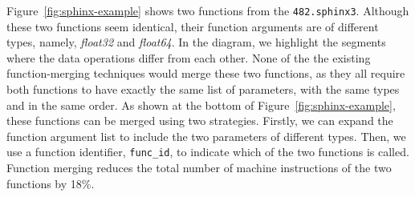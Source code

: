 Figure~\ref{fig:sphinx-example} shows two functions from the \texttt{482.sphinx3}. Although these two functions seem identical, their
function arguments are of different types, namely, \textit{float32} and \textit{float64}. In the diagram, we highlight the segments where
the data operations differ from each other. None of the the existing function-merging techniques would merge these two functions, as they
all require both functions to have exactly the same list of parameters, with the same types and in the same order. As shown at the bottom
of Figure~\ref{fig:sphinx-example}, these functions can be merged using two strategies. Firstly, we can expand the function argument list
to include the two parameters of different types. Then, we use a function identifier, \texttt{func\_id}, to indicate which of the two
functions is called. Function merging reduces the total number of machine instructions of the two functions by 18\%.


